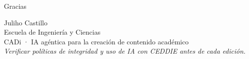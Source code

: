\documentclass[aspectratio=169,11pt]{beamer}
\begin{document}
\begin{frame}{Gracias}
\begin{center}
{\Large Juliho Castillo}\\[0.5em]
Escuela de Ingeniería y Ciencias\\[1em]
CADi · IA agéntica para la creación de contenido académico\\[1.5em]
{\small \emph{Verificar políticas de integridad y uso de IA con CEDDIE antes de cada edición.}}
\end{center}
\end{frame}
\end{document}
